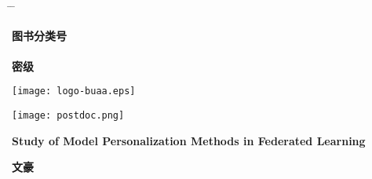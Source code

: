 \thispagestyle{empty}\setcounter{page}{0}

\begin{tabbing}
 \hspace*{0cm} \= \hspace{2.7cm} \= \kill

\underline{\hspace{0.85cm}{\sihao 10006}\hspace{0.85cm}}  \hskip4.1cm
  {\sihao\textbf{图书分类号  }}\underline{\hspace{0.6cm}{\sihao O413}\hspace{0.7cm}}\\ %
  \\
\underline{\hspace{0.85cm}{\sihao B21037}\hspace{0.55cm}}  \hskip4.05cm
  {\sihao\textbf{密\phantom{书分类}级
 }}\underline{\hspace{2.4cm}}
\end{tabbing}

\vspace{1.2cm}

\begin{center}
 \texttt{[image: logo-buaa.eps]}
\end{center}

\vspace{0.15cm}

\begin{center}
\texttt{[image: postdoc.png]}
\end{center}

\vspace{0.15cm}

\begin{center}
{\erhao{}}
\end{center}

\vspace{0.05cm}

\begin{spacing}{2}
\begin{center}{\erhao\bf
Study of Model Personalization Methods in Federated Learning}
\end{center}
\end{spacing}

\vspace{0.05cm}

\begin{center}
{\xiaoerhao\song\boldmath\bf 文豪}
\end{center}

